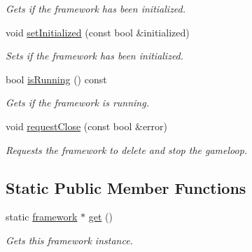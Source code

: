 \begin{DoxyCompactItemize}
\begin{DoxyCompactList}\small\item\em Gets if the framework has been initialized. \end{DoxyCompactList}\item 
void \hyperlink{classflounder_1_1framework_a06963c9a669b09c6e33547a6766432df}{set\+Initialized} (const bool \&initialized)
\begin{DoxyCompactList}\small\item\em Sets if the framework has been initialized. \end{DoxyCompactList}\item 
bool \hyperlink{classflounder_1_1framework_a7e2584d7a3443c07b1d5eac2f44da14f}{is\+Running} () const
\begin{DoxyCompactList}\small\item\em Gets if the framework is running. \end{DoxyCompactList}\item 
void \hyperlink{classflounder_1_1framework_ad443bf70cbc62d372cf39939cd7c2e09}{request\+Close} (const bool \&error)
\begin{DoxyCompactList}\small\item\em Requests the framework to delete and stop the gameloop. \end{DoxyCompactList}\end{DoxyCompactItemize}
\subsection*{Static Public Member Functions}
\begin{DoxyCompactItemize}
\item 
static \hyperlink{classflounder_1_1framework}{framework} $\ast$ \hyperlink{classflounder_1_1framework_a1b1dbf1058cc4589b090326baf1beb87}{get} ()
\begin{DoxyCompactList}\small\item\em Gets this framework instance. \end{DoxyCompactList}\end{DoxyCompactItemize}
